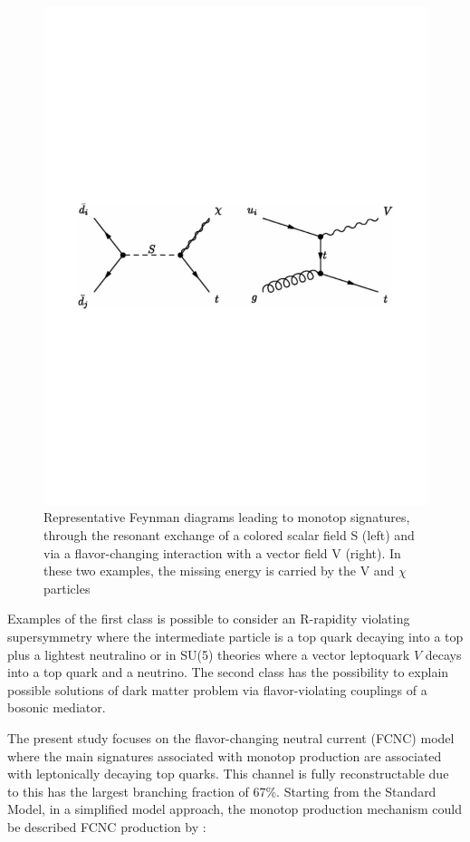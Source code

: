 \begin{figure}
\centering
\includegraphics[scale=0.60]{figures/theory_mtop.pdf}
\caption{Representative Feynman diagrams leading to monotop signatures, through the resonant exchange of a colored scalar field S (left) and via a flavor-changing interaction with a vector field V (right). In these two examples, the missing energy is carried by the V and $\chi$ particles}
\end{figure}

Examples of the first class is possible to consider an R-rapidity violating supersymmetry where the intermediate particle is a top quark decaying into a top plus a lightest neutralino or in SU(5) theories where a vector leptoquark $V$ decays into a top quark and a neutrino. The second class has the possibility to explain possible solutions of dark matter problem via flavor-violating couplings of a bosonic mediator.

The present study focuses on the flavor-changing neutral current (FCNC) model where the main signatures associated with monotop production are associated with leptonically decaying top quarks. This channel is fully reconstructable due to this has the largest branching fraction of 67\%. Starting from the Standard Model, in a simplified model approach, the monotop production mechanism could be described FCNC production by \cite{319,320,322}: 

